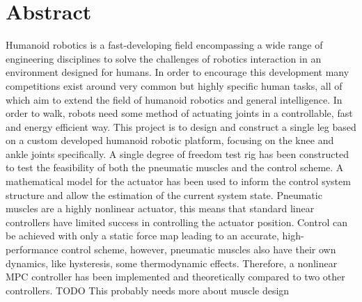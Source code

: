 \section*{Abstract}
Humanoid robotics is a fast-developing field encompassing a wide range of engineering disciplines to solve the challenges of robotics interaction in an environment designed for humans. In order to encourage this development many competitions exist around very common but highly specific human tasks, all of which aim to extend the field of humanoid robotics and general intelligence. In order to walk, robots need some method of actuating joints in a controllable, fast and energy efficient way.\newline
This project is to design and construct a single leg based on a custom developed humanoid robotic platform, focusing on the knee and ankle joints specifically. A single degree of freedom test rig has been constructed to test the feasibility of both the pneumatic muscles and the control scheme.
A mathematical model for the actuator has been used to inform the control system structure and allow the estimation of the current system state. Pneumatic muscles are a highly nonlinear actuator, this means that standard linear controllers have limited success in controlling the actuator position. Control can be achieved with only a static force map leading to an accurate, high-performance control scheme, however, pneumatic muscles also have their own dynamics, like hysteresis, some thermodynamic effects. \newline
Therefore, a nonlinear MPC controller has been implemented and theoretically compared to two other controllers. \newline \newline TODO This probably needs more about muscle design